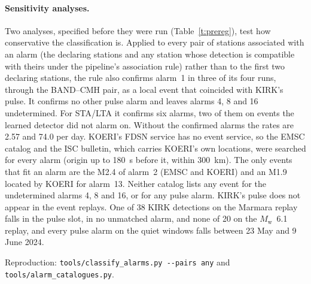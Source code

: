 \documentclass[11pt,a4paper]{article}
\newcommand{\Mw}{$M_\mathrm{w}$}
\newcommand{\stalta}{STA/LTA}
\newcommand{\tool}[1]{\nolinkurl{#1}}
\begin{document}
\paragraph{Sensitivity analyses.} Two analyses, specified before they were run
(Table~\ref{t:prereg}), test how conservative the classification is. Applied to
every pair of stations associated with an alarm (the declaring stations and any
  station whose detection is compatible with theirs under the pipeline's association
rule) rather than to the first two declaring stations, the rule also confirms alarm~1 in three of its four runs, through the BAND--CMH pair, as a local event that coincided with KIRK's pulse. It confirms no other pulse alarm and leaves alarms 4,
8 and 16 undetermined. For \stalta{} it confirms six alarms, two of them on events
the learned detector did not alarm on. Without the confirmed alarms the rates are
2.57 and 74.0 per day. KOERI's FDSN service has no event service, so the EMSC
catalog and the ISC bulletin, which carries KOERI's own locations, were searched for every alarm (origin up to 180~s before it, within 300~km). The only events that fit an alarm are the M2.4 of alarm~2 (EMSC and KOERI) and an M1.9 located by KOERI for alarm~13. Neither catalog lists any event for the undetermined alarms 4, 8 and 16, or for any pulse alarm. KIRK's pulse does not appear in the event replays. One of 38 KIRK detections on the Marmara replay falls in the pulse slot, in no unmatched alarm, and none of 20 on the \Mw{}~6.1 replay, and every pulse alarm on the quiet windows falls between 23 May and 9 June 2024.

\noindent Reproduction: \tool{tools/classify_alarms.py --pairs any} and
\tool{tools/alarm_catalogues.py}.
\end{document}
